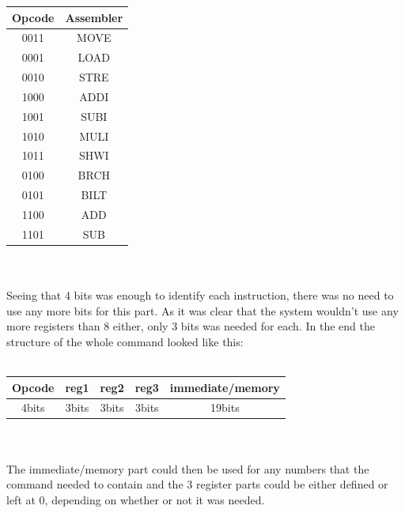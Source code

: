 \documentclass[12pt,a4paper]{article}
\begin{document}
	\begin{tabular}{|c|c|}
\hline 
Opcode & Assembler\tabularnewline
\hline 
\hline 
0011 & MOVE\tabularnewline
\hline 
0001 & LOAD\tabularnewline
\hline 
0010 & STRE\tabularnewline
\hline 
1000 & ADDI\tabularnewline
\hline 
1001 & SUBI\tabularnewline
\hline 
1010 & MULI\tabularnewline
\hline 
1011 & SHWI\tabularnewline
\hline 
0100 & BRCH\tabularnewline
\hline 
0101 & BILT\tabularnewline
\hline 
1100 & ADD\tabularnewline
\hline 
1101 & SUB\tabularnewline
\hline 
\end{tabular}\\
\\
Seeing that 4 bits was enough to identify each instruction, there was no need to use any more bits for this part. As it was clear that the system wouldn't use any more registers than 8 either, only 3 bits was needed for each. In the end the structure of the whole command looked like this:\\
\\
\begin{tabular}{|c|c|c|c|c|}
\hline 
Opcode & reg1 & reg2 & reg3 & immediate/memory\tabularnewline
\hline 
\hline 
4bits & 3bits & 3bits & 3bits & 19bits\tabularnewline
\hline 
\end{tabular}\\
\\
The immediate/memory part could then be used for any numbers that the command needed to contain and the 3 register parts could be either defined or left at 0, depending on whether or not it was needed.
	
\end{document}
